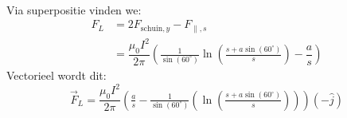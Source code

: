 \begin{enumerate}[(a)]
\begin{description}[labelwidth=1.5cm, leftmargin=!]
\begin{align*}
                            \end{align*}
                            Via superpositie vinden we: 
                            \begin{align*}
                                F_L &= 2F_{\text{schuin}, y} - F_{\parallel, s} \\
                                    &= \dfrac{\mu_0I^2}{2\pi}\left(\tfrac{1}{\sin(60^\circ)}\ln(\tfrac{s+a\sin(60^\circ)}{s}) - \dfrac{a}{s}\right)
                            \end{align*}
                            Vectorieel wordt dit:
                            \begin{equation*}
                                \Vec{F}_L = \dfrac{\mu_0I^2}{2\pi}\left( \tfrac{a}{s} - \tfrac{1}{\sin(60^\circ)}\left(\ln(\tfrac{s+a\sin(60^\circ)}{s}) \right) \right) (-\hat{j})
                            \end{equation*}
        \end{description}
        
\end{enumerate}

\vspace{1cm}